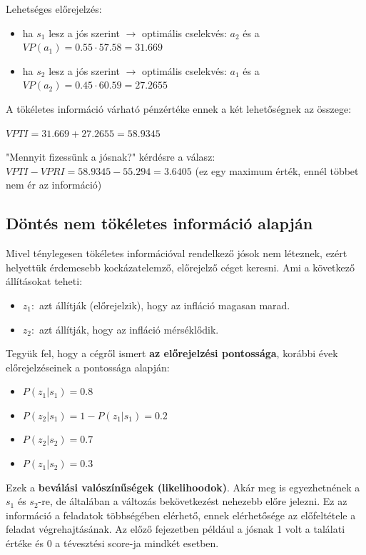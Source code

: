 \documentclass[a4paper,12pt]{article}
\begin{document}
Lehetséges előrejelzés:
\begin{itemize}
\item ha $s_{1}$ lesz a jós szerint $\rightarrow$ optimális cselekvés: $a_2$  és a $VP(a_1) = 0.55\cdot 57.58 = 31.669$
\item ha $s_{2}$ lesz a jós szerint $\rightarrow$ optimális cselekvés: $a_1$  és a $VP(a_2) = 0.45\cdot 60.59 = 27.2655$
\end{itemize}

A tökéletes információ várható pénzértéke ennek a két lehetőségnek az összege: 

$VPTI = 31.669 + 27.2655 = 58.9345$

"Mennyit fizessünk a jósnak?" kérdésre a válasz: $VPTI - VPRI = 58.9345 - 55.294 = 3.6405$ (ez egy maximum érték, ennél többet nem ér az információ)

\subsection{Döntés nem tökéletes információ alapján}
\label{sec:NTI}

Mivel ténylegesen tökéletes információval rendelkező jósok nem léteznek, ezért helyettük érdemesebb kockázatelemző, előrejelző céget keresni. Ami a következő állításokat teheti:
\begin{itemize}
\item $z_{1}:$ azt állítják (előrejelzik), hogy az infláció magasan marad.  %
\item $z_{2}:$ azt állítják, hogy az infláció mérséklődik. %
\end{itemize}

Tegyük fel, hogy a cégről ismert \textbf{az előrejelzési pontossága}, korábbi évek előrejelzéseinek a pontossága alapján:
\begin{itemize}
\item $P(z_{1}|s_1) = 0.8$ 
\item $P(z_{2}|s_1) = 1- P(z_{1}|s_1) = 0.2$
\item $P(z_{2}|s_2) = 0.7$ 
\item $P(z_{1}|s_2) = 0.3$ 
\end{itemize}
Ezek a \textbf{beválási valószínűségek (likelihoodok)}. Akár meg is egyezhetnének a $s_1$ és $s_2$-re, de általában a változás bekövetkezést nehezebb előre jelezni. Ez az információ a feladatok többségében elérhető, ennek elérhetősége az előfeltétele a feladat végrehajtásának. Az előző fejezetben például a jósnak 1 volt a találati értéke és 0 a tévesztési score-ja mindkét esetben.
\end{document}
